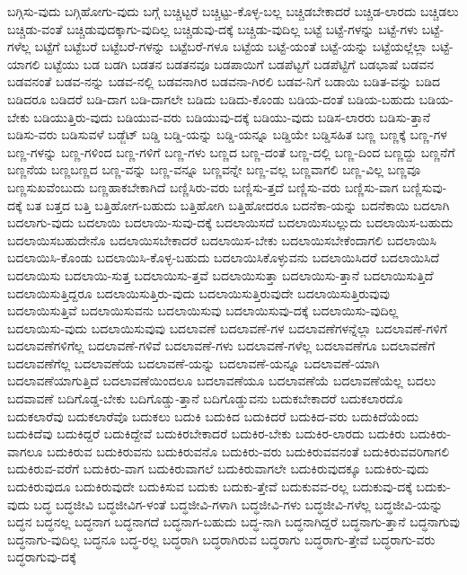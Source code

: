 {ಬಗ್ಗಿಸು-ವುದು
ಬಗ್ಗಿಹೋಗು-ವುದು
ಬಗ್ಗೆ
ಬಚ್ಚಿಟ್ಟರೆ
ಬಚ್ಚಿಟ್ಟು-ಕೊಳ್ಳ-ಬಲ್ಲ
ಬಚ್ಚಿಡಬೇಕಾದರೆ
ಬಚ್ಚಿಡ-ಲಾರದು
ಬಚ್ಚಿಡಲು
ಬಚ್ಚಿಡು-ವಂತೆ
ಬಚ್ಚಿಡುವುದಕ್ಕಾಗು-ವುದಿಲ್ಲ
ಬಚ್ಚಿಡುವು-ದಕ್ಕೆ
ಬಚ್ಚಿಡು-ವುದಿಲ್ಲ
ಬಟ್ಟೆ
ಬಟ್ಟೆ-ಗಳನ್ನು
ಬಟ್ಟೆ-ಗಳು
ಬಟ್ಟೆ-ಗಳೆಲ್ಲ
ಬಟ್ಟೆಗೆ
ಬಟ್ಟೆಬರೆ
ಬಟ್ಟೆಬರೆ-ಗಳನ್ನು
ಬಟ್ಟೆಬರೆ-ಗಳೂ
ಬಟ್ಟೆಯ
ಬಟ್ಟೆ-ಯಂತೆ
ಬಟ್ಟೆ-ಯನ್ನು
ಬಟ್ಟೆಯಲ್ಲೆಲ್ಲಾ
ಬಟ್ಟೆ-ಯಾಗಲಿ
ಬಟ್ಟೆಯು
ಬಡ
ಬಡಗಿ
ಬಡತನ
ಬಡತನವೂ
ಬಡಪಾಯಿಗೆ
ಬಡಪೆಟ್ಟಗೆ
ಬಡಪೆಟ್ಟಿಗೆ
ಬಡಭಾಷೆ
ಬಡವನ
ಬಡವನಂತೆ
ಬಡವ-ನನ್ನು
ಬಡವ-ನಲ್ಲಿ
ಬಡವನಾಗಿರ
ಬಡವನಾ-ಗಿರಲಿ
ಬಡವ-ನಿಗೆ
ಬಡಾಯಿ
ಬಡಿತ-ವನ್ನು
ಬಡಿದ
ಬಡಿದರೂ
ಬಡಿದರೆ
ಬಡಿ-ದಾಗ
ಬಡಿ-ದಾಗಲೇ
ಬಡಿದು
ಬಡಿದು-ಕೊಂಡು
ಬಡಿಯ-ದಂತೆ
ಬಡಿಯ-ಬಹುದು
ಬಡಿಯ-ಬೇಕು
ಬಡಿಯುತ್ತಿರು-ವುದು
ಬಡಿಯುವ-ವರು
ಬಡಿಯುವು-ದಕ್ಕೆ
ಬಡಿಯು-ವುದು
ಬಡಿಸ-ಲಾರರು
ಬಡಿಸು-ತ್ತಾನೆ
ಬಡಿಸು-ವರು
ಬಡಿಸುವಳೆ
ಬಡ್ಜೆಟ್
ಬಡ್ಡಿ
ಬಡ್ಡಿ-ಯನ್ನು
ಬಡ್ಡಿ-ಯನ್ನೂ
ಬಡ್ಡಿಯೇ
ಬಡ್ಡಿಸಹಿತ
ಬಣ್ಣ
ಬಣ್ಣಕ್ಕೆ
ಬಣ್ಣ-ಗಳ
ಬಣ್ಣ-ಗಳನ್ನು
ಬಣ್ಣ-ಗಳಿಂದ
ಬಣ್ಣ-ಗಳಿಗೆ
ಬಣ್ಣ-ಗಳು
ಬಣ್ಣದ
ಬಣ್ಣ-ದಂತೆ
ಬಣ್ಣ-ದಲ್ಲಿ
ಬಣ್ಣ-ದಿಂದ
ಬಣ್ಣದ್ದು
ಬಣ್ಣನೆಗೆ
ಬಣ್ಣನೆಯ
ಬಣ್ಣಬಣ್ಣದ
ಬಣ್ಣ-ವನ್ನು
ಬಣ್ಣ-ವನ್ನೂ
ಬಣ್ಣವನ್ನೇ
ಬಣ್ಣ-ವಲ್ಲ
ಬಣ್ಣವಾಗಲಿ
ಬಣ್ಣ-ವಿಲ್ಲ
ಬಣ್ಣವೂ
ಬಣ್ಣಸುಖವೆಂಬುದು
ಬಣ್ಣಹಾಕಬೇಕಾಗಿದೆ
ಬಣ್ಣಿಸಿರು-ವರು
ಬಣ್ಣಿಸು-ತ್ತದೆ
ಬಣ್ಣಿಸು-ವರು
ಬಣ್ಣಿಸು-ವಾಗ
ಬಣ್ಣಿಸುವು-ದಕ್ಕೆ
ಬತ
ಬತ್ತದ
ಬತ್ತಿ
ಬತ್ತಿಹೋಗ-ಬಹುದು
ಬತ್ತಿಹೋಗಿ
ಬತ್ತಿಹೋದರೂ
ಬದನೆಕಾ-ಯನ್ನು
ಬದನೆಕಾಯಿ
ಬದಲಾಗಿ
ಬದಲಾಗು-ವುದು
ಬದಲಾಯಿ
ಬದಲಾಯಿ-ಸುವು-ದಕ್ಕೆ
ಬದಲಾಯಿಸದೆ
ಬದಲಾಯಿಸಬಲ್ಲುದು
ಬದಲಾಯಿಸ-ಬಹುದು
ಬದಲಾಯಿಸಬಹುದೇನೊ
ಬದಲಾಯಿಸಬೇಕಾದರೆ
ಬದಲಾಯಿಸ-ಬೇಕು
ಬದಲಾಯಿಸಬೇಕೆಂದಾಗಲಿ
ಬದಲಾಯಿಸಿ
ಬದಲಾಯಿಸಿ-ಕೊಂಡು
ಬದಲಾಯಿಸಿ-ಕೊಳ್ಳ-ಬಹುದು
ಬದಲಾಯಿಸಿಕೊಳ್ಳುವನು
ಬದಲಾಯಿಸಿದರೆ
ಬದಲಾಯಿಸಿದೆ
ಬದಲಾಯಿಸು
ಬದಲಾಯಿ-ಸುತ್ತ
ಬದಲಾಯಿಸು-ತ್ತವೆ
ಬದಲಾಯಿಸುತ್ತಾ
ಬದಲಾಯಿಸು-ತ್ತಾನೆ
ಬದಲಾಯಿಸುತ್ತಿದೆ
ಬದಲಾಯಿಸುತ್ತಿದ್ದರೂ
ಬದಲಾಯಿಸುತ್ತಿರು-ವುದು
ಬದಲಾಯಿಸುತ್ತಿರುವುದೇ
ಬದಲಾಯಿಸುತ್ತಿರುವುವು
ಬದಲಾಯಿಸುತ್ತಿವೆ
ಬದಲಾಯಿಸುವನು
ಬದಲಾಯಿಸುವು
ಬದಲಾಯಿಸುವು-ದಕ್ಕೆ
ಬದಲಾಯಿಸು-ವುದಿಲ್ಲ
ಬದಲಾಯಿಸು-ವುದು
ಬದಲಾಯಿಸುವುವು
ಬದಲಾವಣೆ
ಬದಲಾವಣೆ-ಗಳ
ಬದಲಾವಣೆಗಳನ್ನೆಲ್ಲಾ
ಬದಲಾವಣೆ-ಗಳಿಗೆ
ಬದಲಾವಣೆಗಳಿಗೆಲ್ಲ
ಬದಲಾವಣೆ-ಗಳಿವೆ
ಬದಲಾವಣೆ-ಗಳು
ಬದಲಾವಣೆ-ಗಳೆಲ್ಲ
ಬದಲಾವಣೆಗೂ
ಬದಲಾವಣೆಗೆ
ಬದಲಾವಣೆಗೆಲ್ಲ
ಬದಲಾವಣೆಯ
ಬದಲಾವಣೆ-ಯನ್ನು
ಬದಲಾವಣೆ-ಯನ್ನೂ
ಬದಲಾವಣೆ-ಯಾಗಿ
ಬದಲಾವಣೆಯಾಗುತ್ತಿದೆ
ಬದಲಾವಣೆಯಿಂದಲೂ
ಬದಲಾವಣೆಯೂ
ಬದಲಾವಣೆಯೆ
ಬದಲಾವಣೆಯೆಲ್ಲ
ಬದಲು
ಬದವಾವಣೆ
ಬದಿಗೊಡ್ಡ-ಬೇಕು
ಬದಿಗೊಡ್ಡು-ತ್ತಾನೆ
ಬದಿಗೊಡ್ಡುವನು
ಬದುಕಬೇಕಾದರೆ
ಬದುಕಲಾರದೊ
ಬದುಕಲಾರೆವು
ಬದುಕಲಾರೆವೊ
ಬದುಕಲು
ಬದುಕಿ
ಬದುಕಿದ
ಬದುಕಿದರೆ
ಬದುಕಿದ-ವರು
ಬದುಕಿದೆಯೆಂದು
ಬದುಕಿದೆವು
ಬದುಕಿದ್ದರೆ
ಬದುಕಿದ್ದೇವೆ
ಬದುಕಿರಬೇಕಾದರೆ
ಬದುಕಿರ-ಬೇಕು
ಬದುಕಿರ-ಲಾರದು
ಬದುಕಿರು
ಬದುಕಿರು-ವಾಗಲೂ
ಬದುಕಿರುವ
ಬದುಕಿರುವನು
ಬದುಕಿರುವನೊ
ಬದುಕಿರು-ವರು
ಬದುಕಿರುವವನಂತೆ
ಬದುಕಿರುವವರಿಗಾಗಲಿ
ಬದುಕಿರುವ-ವರೆಗೆ
ಬದುಕಿರು-ವಾಗ
ಬದುಕಿರುವಾಗಲೆ
ಬದುಕಿರುವಾಗಲೇ
ಬದುಕಿರುವುದಕ್ಕೂ
ಬದುಕಿರು-ವುದು
ಬದುಕಿರುವುದೂ
ಬದುಕಿರುವುದೇ
ಬದುಕಿಸುವ
ಬದುಕು
ಬದುಕು-ತ್ತೇವೆ
ಬದುಕುವವ-ರಲ್ಲ
ಬದುಕುವು-ದಕ್ಕೆ
ಬದುಕು-ವುದು
ಬದ್ಧ
ಬದ್ಧಜೀವಿ
ಬದ್ಧಜೀವಿಗ-ಳಂತೆ
ಬದ್ಧಜೀವಿ-ಗಳಾಗಿ
ಬದ್ಧಜೀವಿ-ಗಳು
ಬದ್ಧಜೀವಿ-ಗಳೆಲ್ಲ
ಬದ್ಧಜೀವಿ-ಯನ್ನು
ಬದ್ಧನ
ಬದ್ಧನಲ್ಲ
ಬದ್ಧನಾಗ
ಬದ್ಧನಾಗದೆ
ಬದ್ಧನಾಗ-ಬಹುದು
ಬದ್ಧ-ನಾಗಿ
ಬದ್ಧನಾಗಿದ್ದರೆ
ಬದ್ಧನಾಗು-ತ್ತಾನೆ
ಬದ್ಧನಾಗುವು
ಬದ್ಧನಾಗು-ವುದಿಲ್ಲ
ಬದ್ಧನೂ
ಬದ್ಧ-ರಲ್ಲ
ಬದ್ಧರಾಗಿ
ಬದ್ಧರಾಗಿರುವ
ಬದ್ಧರಾಗು
ಬದ್ಧರಾಗು-ತ್ತೇವೆ
ಬದ್ಧರಾಗು-ವರು
ಬದ್ಧರಾಗುವು-ದಕ್ಕೆ
}
